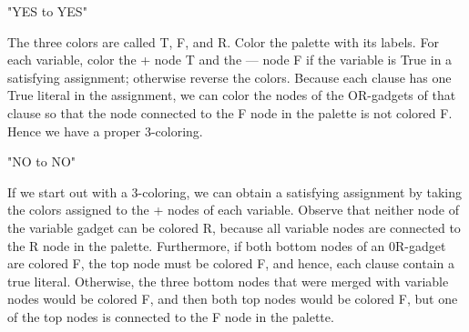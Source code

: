 \documentclass{zpt}
\begin{document}
"YES to YES"

The three colors are called T, F, and R. Color the palette with its labels. For each variable, color the + node T and the — node F if the variable is True in a satisfying assignment; otherwise reverse the colors. Because each clause has one True literal in the assignment, we can color the nodes of the OR-gadgets of that clause so that the node connected to the F node in the palette is not colored F. Hence we have a proper 3-coloring.

"NO to NO"

If we start out with a 3-coloring, we can obtain a satisfying assignment by taking the colors assigned to the + nodes of each variable. Observe that neither node of the variable gadget can be colored R, because all variable nodes are connected to the R node in the palette. Furthermore, if both bottom nodes of an 0R-gadget are colored F, the top node must be colored F, and hence, each clause contain a true literal. Otherwise, the three bottom nodes that were merged with variable nodes would be colored F, and then both top nodes would be colored F, but one of the top nodes is connected to the F node in the palette.
\end{document}
